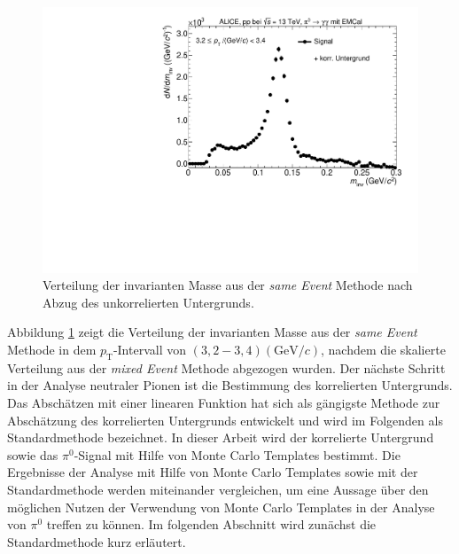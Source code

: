 \begin{figure}[t]
\centering
\includegraphics[width=.75\linewidth]{hInvMass_Data.pdf}
\caption{Verteilung der invarianten Masse aus der \textit{same Event} Methode nach Abzug des unkorrelierten Untergrunds.}
\label{figInvMass_Data}
\end{figure}
\newline
Abbildung \ref{figInvMass_Data} zeigt die Verteilung der invarianten Masse aus der \textit{same Event} Methode in dem $p_\text{T}$-Intervall von $(3,2 - 3,4) (\text{GeV/}c)$, nachdem die skalierte Verteilung aus der \textit{mixed Event} Methode abgezogen wurden.
\newline
Der nächste Schritt in der Analyse neutraler Pionen ist die Bestimmung des korrelierten Untergrunds.
Das Abschätzen mit einer linearen Funktion hat sich als gängigste Methode zur Abschätzung des korrelierten Untergrunds entwickelt und wird im Folgenden als Standardmethode bezeichnet.
In dieser Arbeit wird der korrelierte Untergrund sowie das $\pi^{0}$-Signal mit Hilfe von Monte Carlo Templates bestimmt.
Die Ergebnisse der Analyse mit Hilfe von Monte Carlo Templates sowie mit der Standardmethode werden miteinander vergleichen, um eine Aussage über den möglichen Nutzen der Verwendung von Monte Carlo Templates in der Analyse von $\pi^{0}$ treffen zu können.
Im folgenden Abschnitt wird zunächst die Standardmethode kurz erläutert.
